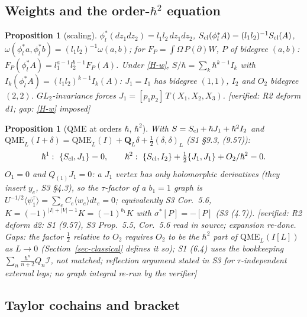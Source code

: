 \documentclass[10pt,a4paper]{article}
\numberwithin{equation}{section}
\newtheorem{proposition}[theorem]{Proposition}
\theoremstyle{definition}
\theoremstyle{remark}
\newcommand{\ver}[1]{\textup{[verified: #1]}}
\begin{document}
\subsection{\texorpdfstring{Weights and the order-$\hbar^2$ equation}{Weights and the order-hbar2 equation}}

\begin{proposition}[scaling]\label{prop-scal}
$\phi_l^*(dz_1dz_2)=l_1l_2\,dz_1dz_2$, $S_{\rm cl}(\phi_l^*A)=(l_1l_2)^{-1}S_{\rm cl}(A)$, $\omega(\phi_l^*a,\phi_l^*b)=(l_1l_2)^{-1}\omega(a,b)$; for $F_P=\int\Omega\,P(\partial)W$, $P$ of bidegree $(a,b)$: $F_P(\phi_l^*A)=l_1^{a-1}l_2^{b-1}F_P(A)$. Under \ref{H-w}, $S/\hbar=\sum_k\hbar^{k-1}I_k$ with $I_k(\phi^*_lA)=(l_1l_2)^{k-1}I_k(A)$: $J_1=I_1$ has bidegree $(1,1)$, $I_2$ and $O_2$ bidegree $(2,2)$. $GL_2$-invariance forces $J_1=[p_1p_2]\,T(X_1,X_2,X_3)$.
\ver{R2 deform d1; gap: \ref{H-w} imposed}
\end{proposition}

\begin{proposition}[QME at orders $\hbar$, $\hbar^2$]\label{prop-qme}
With $S=S_{\rm cl}+\hbar J_1+\hbar^2I_2$ and $\mathrm{QME}_L(I+\delta)=\mathrm{QME}_L(I)+\mathbf Q_L\delta+\frac12(\delta,\delta)_L$ (S1 \S9.3, (9.57)):
\begin{equation}
\hbar^1:\ \{S_{\rm cl},J_1\}=0,\qquad \hbar^2:\ \{S_{\rm cl},I_2\}+\tfrac12\{J_1,J_1\}+O_2/\hbar^2=0 .\label{eq-qme2}
\end{equation}
$O_1=0$ and $Q_{(1)}J_1=0$: a $J_1$ vertex has only holomorphic derivatives (they insert $y_e$, S3 \S4.3), so the $\tau$-factor of a $b_1=1$ graph is $U^{-1/2}\langle\psi^\tau_1\rangle=\sum_eC_e\langle w_e\rangle dt_e=0$; equivalently S3 Cor.~5.6, $K=(-1)^{|I|+|V|-1}K=(-1)^{b_1}K$ with $\sigma^*[P]=-[P]$ (S3 (4.7)).
\ver{R2 deform d2: S1 (9.57), S3 Prop.~5.5, Cor.~5.6 read in source; expansion re-done. Gaps: the factor $\frac12$ relative to $O_2$ requires $O_2$ to be the $\hbar^2$ part of $\mathrm{QME}_L(I[L])$ as $L\to0$ (Section~\ref{sec-classical} defines it so); S1 (6.4) uses the bookkeeping $\sum_n\frac{\hbar^n}{n+2}Q_n\mathcal I$, not matched; reflection argument stated in S3 for $\tau$-independent external legs; no graph integral re-run by the verifier}
\end{proposition}

\subsection{Taylor cochains and bracket}
\end{document}
